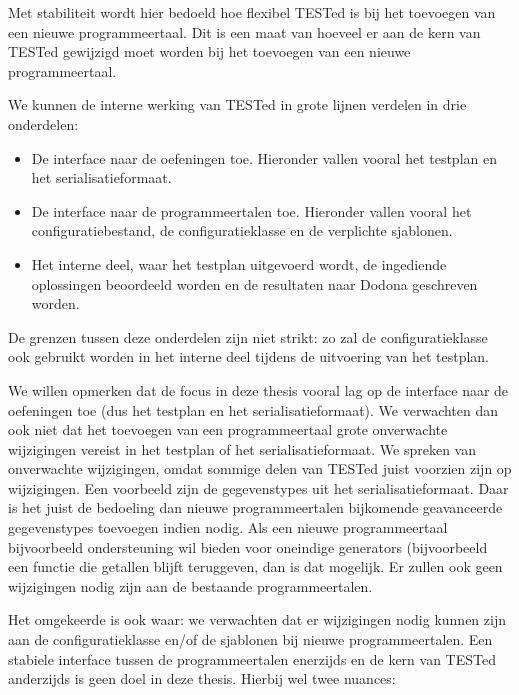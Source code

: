 Met stabiliteit wordt hier bedoeld hoe flexibel TESTed is bij het toevoegen van een nieuwe programmeertaal.
Dit is een maat van hoeveel er aan de kern van TESTed gewijzigd moet worden bij het toevoegen van een nieuwe programmeertaal.

We kunnen de interne werking van TESTed in grote lijnen verdelen in drie onderdelen:

\begin{itemize}
    \item De interface naar de oefeningen toe.
    Hieronder vallen vooral het testplan en het serialisatieformaat.
    \item De interface naar de programmeertalen toe.
    Hieronder vallen vooral het configuratiebestand, de configuratieklasse en de verplichte sjablonen.
    \item Het interne deel, waar het testplan uitgevoerd wordt, de ingediende oplossingen beoordeeld worden en de resultaten naar Dodona geschreven worden.
\end{itemize}

De grenzen tussen deze onderdelen zijn niet strikt: zo zal de configuratieklasse ook gebruikt worden in het interne deel tijdens de uitvoering van het testplan.

We willen opmerken dat de focus in deze thesis vooral lag op de interface naar de oefeningen toe (dus het testplan en het serialisatieformaat).
We verwachten dan ook niet dat het toevoegen van een programmeertaal grote onverwachte wijzigingen vereist in het testplan of het serialisatieformaat.
We spreken van onverwachte wijzigingen, omdat sommige delen van TESTed juist voorzien zijn op wijzigingen.
Een voorbeeld zijn de gegevenstypes uit het serialisatieformaat.
Daar is het juist de bedoeling dan nieuwe programmeertalen bijkomende geavanceerde gegevenstypes toevoegen indien nodig.
Als een nieuwe programmeertaal bijvoorbeeld ondersteuning wil bieden voor oneindige generators (bijvoorbeeld een functie die getallen blijft teruggeven, dan is dat mogelijk.
Er zullen ook geen wijzigingen nodig zijn aan de bestaande programmeertalen.

Het omgekeerde is ook waar: we verwachten dat er wijzigingen nodig kunnen zijn aan de configuratieklasse en/of de sjablonen bij nieuwe programmeertalen.
Een stabiele interface tussen de programmeertalen enerzijds en de kern van TESTed anderzijds is geen doel in deze thesis.
Hierbij wel twee nuances:

